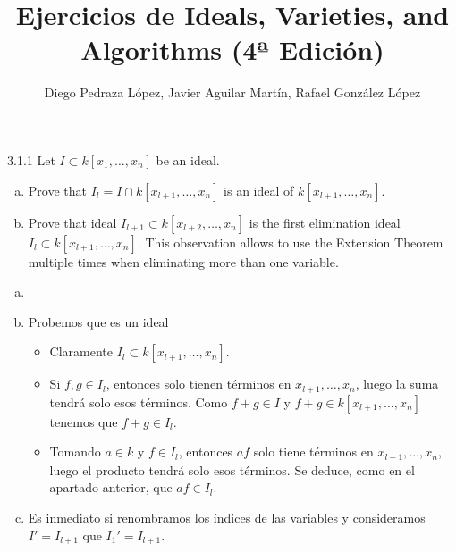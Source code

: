 \documentclass[twoside]{article}
\begin{document}
\title{Ejercicios de Ideals, Varieties, and Algorithms (4ª Edición)}
\author{Diego Pedraza López, Javier Aguilar Martín, Rafael González López}
\maketitle

\begin{ejercicio}{3.1.1}
Let $I\subset k[x_1,\dotsc,x_n]$ be an ideal.
\begin{enumerate}[a.]
\item Prove that $I_l = I\cap k[x_{l+1},\dotsc,x_n]$ is an ideal of $k[x_{l+1},\dotsc,x_n]$.
\item Prove that ideal $I_{l+1} \subset k[x_{l+2},\dotsc,x_n]$ is the first elimination ideal $I_l \subset k[x_{l+1},\dotsc,x_n]$. This observation allows to use the Extension Theorem multiple times when eliminating more than one variable.
\end{enumerate}
\end{ejercicio}
\begin{solucion}
\begin{enumerate}[a.]
\item[]
\item Probemos que es un ideal
\begin{itemize}
\item Claramente $I_l \subset k[x_{l+1},\dotsc,x_n]$.
\item Si $f,g\in I_l$, entonces solo tienen términos en $x_{l+1},\dotsc,x_n$, luego la suma tendrá solo esos términos. Como $f+g\in I$ y $f+g\in k[x_{l+1},\dotsc,x_n]$ tenemos que $f+g\in I_l$.
\item Tomando $a\in k$ y $f \in I_l$, entonces $af$ solo tiene términos en $x_{l+1},\dotsc,x_n$, luego el producto tendrá solo esos términos. Se deduce, como en el apartado anterior, que $af\in I_l$.
\end{itemize}
\item Es inmediato si renombramos los índices de las variables y consideramos $I'=I_{l+1}$ que $I_1'=I_{l+1}$.
\end{enumerate}
\end{solucion}

\newpage
\end{document}
